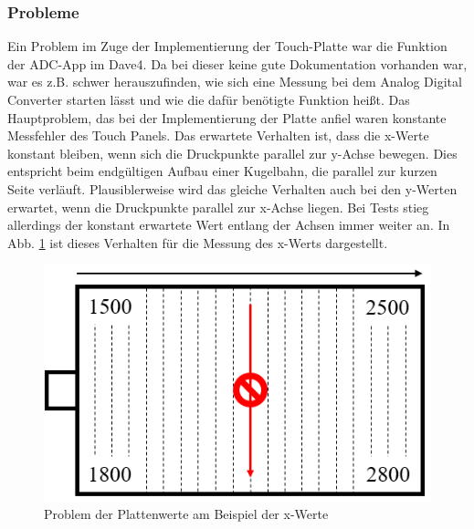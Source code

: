 \documentclass[12pt,a4paper,bibliography=totoc,listof=totoc]{scrartcl}
\begin{document}
\subsubsection{Probleme} \label{subsec:ProblemePlatte}
Ein Problem im Zuge der Implementierung der Touch-Platte war die Funktion der ADC-App im Dave4. Da bei dieser keine gute Dokumentation vorhanden war, war es z.B. schwer herauszufinden, wie sich eine Messung bei dem Analog Digital Converter starten lässt und wie die dafür benötigte Funktion heißt. \newline
Das Hauptproblem, das bei der Implementierung der Platte anfiel waren konstante Messfehler des Touch Panels. Das erwartete Verhalten ist, dass die x-Werte konstant bleiben, wenn sich die Druckpunkte parallel zur y-Achse bewegen. Dies entspricht beim endgültigen Aufbau einer Kugelbahn, die parallel zur kurzen Seite verläuft. Plausiblerweise wird das gleiche Verhalten auch bei den y-Werten erwartet, wenn die Druckpunkte parallel zur x-Achse liegen.
Bei Tests stieg allerdings der konstant erwartete Wert entlang der Achsen immer weiter an. In Abb. \ref{fig:ProblemPlattenwerte} ist dieses Verhalten für die Messung des x-Werts dargestellt.
\begin{figure}[htbp]
	\centering
	\includegraphics[scale = 0.6]{pics/ProblemPlattenwerte}
	\caption{Problem der Plattenwerte am Beispiel der x-Werte}
	\label{fig:ProblemPlattenwerte}
\end{figure}
\end{document}
